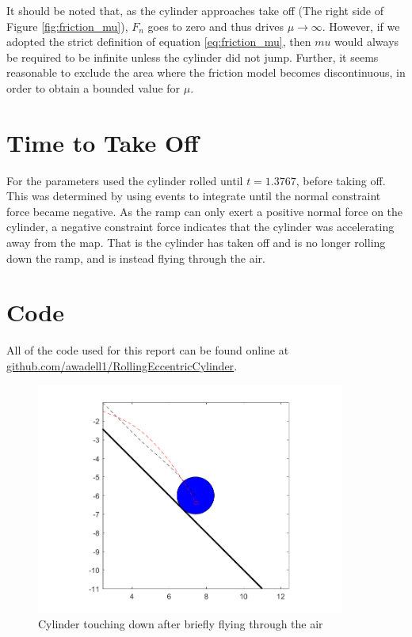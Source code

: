 \documentclass[12pt]{article}
\let\Oldsection\section
\renewcommand{\section}{\FloatBarrier\Oldsection}
\begin{document}
It should be noted that, as the cylinder approaches take off (The right side of Figure \ref{fig:friction_mu}), $F_n$ goes to zero and thus drives $\mu \to \infty$.
However, if we adopted the strict definition of equation \ref{eq:friction_mu}, then $mu$ would always be required to be infinite unless the cylinder did not jump.
Further, it seems reasonable to exclude the area where the friction model becomes discontinuous, in order to obtain a bounded value for $\mu$.

\section{Time to Take Off}
For the parameters used the cylinder rolled until $t = 1.3767$, before taking off.
This was determined by using events to integrate until the normal constraint force became negative.
As the ramp can only exert a positive normal force on the cylinder, a negative constraint force indicates that the cylinder was accelerating away from the map.
That is the cylinder has taken off and is no longer rolling down the ramp, and is instead flying through the air.

\section{Code}
All of the code used for this report can be found online at \url{github.com/awadell1/RollingEccentricCylinder}.
\begin{figure}[h]
\centering
\includegraphics[height=3in]{img/animate.png}
\caption{Cylinder touching down after briefly flying through the air}
\label{fig:animate}
\end{figure}
\end{document}
